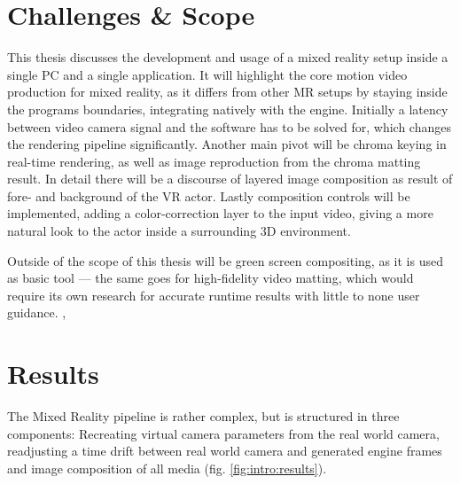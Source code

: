 \section{Challenges \& Scope}
\label{sec:intro:challenges}

This thesis discusses the development and usage of a mixed reality setup inside 
a single PC and a single application.
\newline
It will highlight the core motion video production for mixed reality, as it 
differs from other MR setups by staying inside the programs boundaries, 
integrating natively with the engine. Initially a latency between video camera 
signal and the software has to be solved for, which changes the rendering 
pipeline significantly.
\newline
Another main pivot will be chroma keying in real-time rendering, as well as 
image reproduction from the chroma matting result. In detail there will be a 
discourse of layered image composition as result of fore- and background of the 
VR actor.
\newline
Lastly composition controls will be implemented, adding a color-correction 
layer to the input video, giving a more natural look to the actor inside a 
surrounding 3D environment.

Outside of the scope of this thesis will be green screen compositing, as it is 
used as basic tool --- the same goes for high-fidelity video matting, which 
would require its own research for accurate runtime results with little to none 
user guidance. 
\cite{gong:realtime-matting:2010}, \cite{gastal:shared-sampling:2010}

\section{Results}

The Mixed Reality pipeline is rather complex, but is structured in three 
components: Recreating virtual camera parameters from the real world camera, 
readjusting a time drift between real world camera and generated engine frames 
and image composition of all media (fig. \ref{fig:intro:results}).

